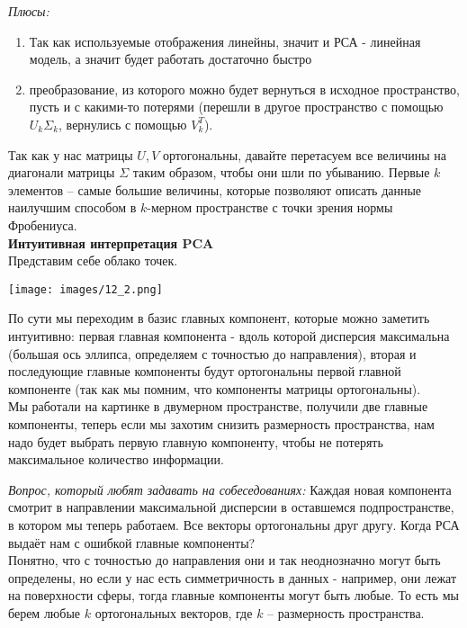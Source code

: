 \textit{Плюсы:}

\begin{enumerate}
    \item Так как используемые отображения линейны, значит и РСА - линейная модель, а значит будет работать достаточно быстро
    \item преобразование, из которого можно будет вернуться в исходное пространство, пусть и с какими-то потерями (перешли в другое пространство с помощью $U_k\Sigma_k$, вернулись с помощью $V_k^T$).
\end{enumerate}

Так как у нас матрицы $U, V$ ортогональны, давайте перетасуем все величины на диагонали матрицы $\Sigma$ таким образом, чтобы они шли по убыванию. Первые $k$ элементов -- самые большие величины, которые позволяют описать данные наилучшим способом в $k$-мерном пространстве с точки зрения нормы Фробениуса. \\

\textbf{Интуитивная интерпретация PCA}\\

Представим себе облако точек. 

\begin{center}
    \texttt{[image: images/12\_2.png]}
\end{center}

По сути мы переходим в базис главных компонент, которые можно заметить интуитивно: первая главная компонента - вдоль которой дисперсия максимальна (большая ось эллипса, определяем с точностью до направления), вторая и последующие главные компоненты будут ортогональны первой главной компоненте (так как мы помним, что компоненты матрицы ортогональны). \\

Мы работали на картинке в двумерном пространстве, получили две главные компоненты, теперь если мы захотим снизить размерность пространства, нам надо будет выбрать первую главную компоненту, чтобы не потерять максимальное количество информации.\\

\begin{note}
\textit{Вопрос, который любят задавать на собеседованиях:}
Каждая новая компонента смотрит в направлении максимальной дисперсии в оставшемся подпространстве, в котором мы теперь работаем. Все векторы ортогональны друг другу.
Когда РСА выдаёт нам с ошибкой главные компоненты?\\


Понятно, что с точностью до направления они и так неоднозначно могут быть определены, но если у нас есть симметричность в данных - например, они лежат на поверхности сферы, тогда главные компоненты могут быть любые. То есть мы берем любые $k$ ортогональных векторов, где $k$ -- размерность пространства.
\end{note}

